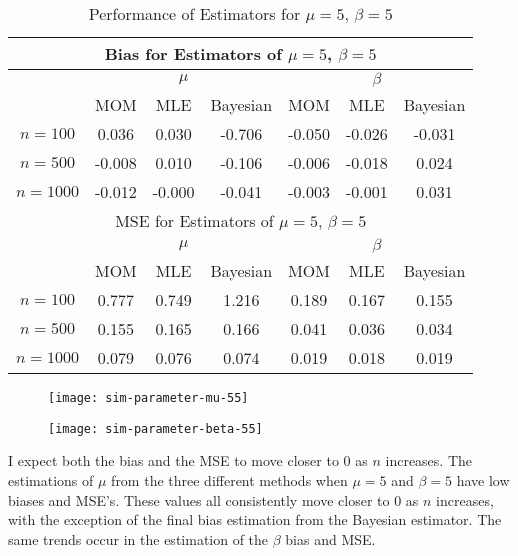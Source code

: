 \documentclass{svproc}
\begin{document}
\begin{table}
\begin{center}
\begin{tabular}{|c|c|c|c|c|c|c|}
\hline
\multicolumn{7}{|c|}{Bias for Estimators of $\mu = 5$, $\beta = 5$}\\
\hline
  &\multicolumn{3}{|c|}{$\mu$} &\multicolumn{3}{|c|}{$\beta$}\\
\hline
 & MOM & MLE & Bayesian & MOM & MLE & Bayesian \\
\hline
$n = 100$ & 0.036 & 0.030 & -0.706 & -0.050 & -0.026 & -0.031\\
\hline
$n = 500$ & -0.008 & 0.010 & -0.106 & -0.006 & -0.018 & 0.024\\
\hline
$n = 1000$ & -0.012 & -0.000 & -0.041 & -0.003 & -0.001 & 0.031\\
\hline
\hline
\multicolumn{7}{|c|}{MSE for Estimators of $\mu = 5$, $\beta = 5$}\\
\hline
  &\multicolumn{3}{|c|}{$\mu$} &\multicolumn{3}{|c|}{$\beta$}\\
\hline
 & MOM & MLE & Bayesian & MOM & MLE & Bayesian \\
\hline
$n = 100$ & 0.777 & 0.749 & 1.216 & 0.189 & 0.167 & 0.155\\
\hline
$n = 500$ & 0.155 & 0.165 & 0.166 & 0.041 & 0.036 & 0.034\\
\hline
$n = 1000$ & 0.079 & 0.076 & 0.074 & 0.019 & 0.018 & 0.019\\
\hline
\end{tabular}
\medskip
\caption{Performance of Estimators for $\mu = 5$, $\beta = 5$}
\label{tab2}
\end{center}
\end{table}

\smallskip

\begin{figure}
\begin{center}
\texttt{[image: sim-parameter-mu-55]}
\label{plot7}
\end{center}
\end{figure}

\begin{figure}
\begin{center}
\texttt{[image: sim-parameter-beta-55]}
\label{plot8}
\end{center}
\end{figure}

I expect both the bias and the MSE to move closer to $0$ as $n$ increases. The estimations of $\mu$ from the three different methods when $\mu = 5$ and $\beta = 5$ have low biases and MSE's. These values all consistently move closer to $0$ as $n$ increases, with the exception of the final bias estimation from the Bayesian estimator. The same trends occur in the estimation of the $\beta$ bias and MSE.
\end{document}
